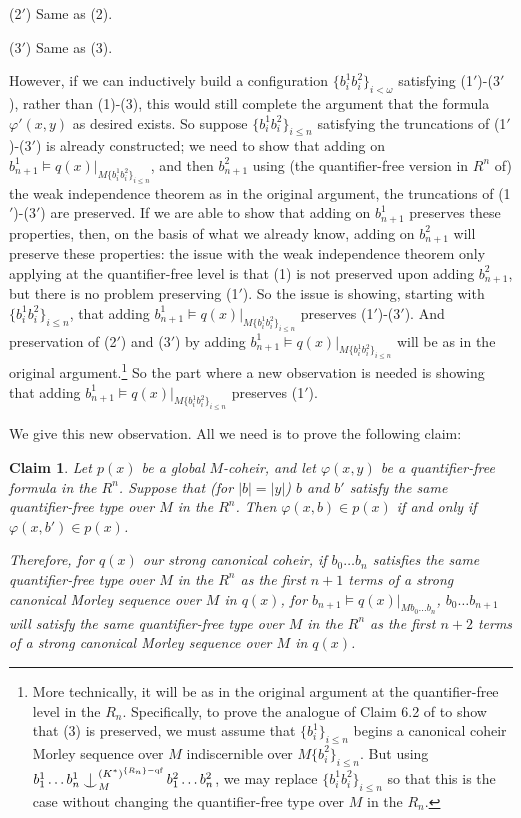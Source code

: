 \documentclass{article}
\newtheorem{claim}{Claim}
\theoremstyle{definition}
\theoremstyle{definition}
\theoremstyle{definition}
\def\Ind#1#2{#1\setbox0=\hbox{$#1x$}\kern\wd0\hbox to 0pt{\hss$#1\mid$\hss}
\lower.9\ht0\hbox to 0pt{\hss$#1\smile$\hss}\kern\wd0}
\def\ind{\mathop{\mathpalette\Ind{}}}
\begin{document}
(2$'$) Same as (2).

(3$'$) Same as (3).



However, if we can inductively build a configuration $\{b^{1}_{i}b_{i}^{2}\}_{i < \omega}$ satisfying (1$'$)-(3$'$), rather than (1)-(3), this would still complete the argument that the formula $\varphi'(x, y)$ as desired exists. So suppose $\{b^{1}_{i}b_{i}^{2}\}_{i \leq n}$ satisfying the truncations of (1$'$)-(3$'$) is already constructed; we need to show that adding on $b^{1}_{n+1} \models q(x)|_{M \{b^{1}_{i}b_{i}^{2}\}_{i \leq n} } $, and then $b^{2}_{n+1} $ using (the quantifier-free version in $R^{n}$ of) the weak independence theorem as in the original argument, the truncations of (1$'$)-(3$'$) are preserved. If we are able to show that adding on $b^{1}_{n+1}$ preserves these properties, then, on the basis of what we already know, adding on $b^{2}_{n+1} $ will preserve these properties: the issue with the weak independence theorem only applying at the quantifier-free level is that (1) is not preserved upon adding $b^{2}_{n+1} $, but there is no problem preserving (1$'$). So the issue is showing, starting with $\{b^{1}_{i}b_{i}^{2}\}_{i \leq n}$, that adding $b^{1}_{n+1} \models q(x)|_{M \{b^{1}_{i}b_{i}^{2}\}_{i \leq n} } $ preserves (1$'$)-(3$'$). And preservation of (2$'$) and (3$'$) by adding $b^{1}_{n+1} \models q(x)|_{M \{b^{1}_{i}b_{i}^{2}\}_{i \leq n} } $ will be as in the original argument.\footnote{More technically, it will be as in the original argument at the quantifier-free level in the $R_{n}$. Specifically, to prove the analogue of Claim 6.2 of \cite{Mutchnik2026nsop2} to show that (3) is preserved, we must assume that $\{b^{1}_{i}\}_{i \leq n}$ begins a canonical coheir Morley sequence over $M$ indiscernible over $M\{b^{2}_{i}\}_{i \leq n}$. But using $b^{1}_{1} \ldots b^{1}_{n}  \ind^{(K^{*})^{\{R_{n}\}-\mathrm{qf}}}_{M}b^{2}_{1} \ldots b^{2}_{n}$, we may replace $\{b^{1}_{i}b_{i}^{2}\}_{i \leq n}$ so that this is the case without changing the quantifier-free type over $M$ in the $R_{n}$.} So the part where a new observation is needed is showing that adding $b^{1}_{n+1} \models q(x)|_{M \{b^{1}_{i}b_{i}^{2}\}_{i \leq n} } $ preserves (1$'$).

We give this new observation. All we need is to prove the following claim:

\begin{claim}
    Let $p(x)$ be a global $M$-coheir, and let $\varphi(x, y)$ be a quantifier-free formula in the $R^{n}$. Suppose that (for $|b| = |y|$) $b$ and $b'$ satisfy the same quantifier-free type over $M$ in the $R^{n}$. Then $\varphi(x, b) \in p(x)$ if and only if $\varphi(x, b') \in p(x)$.

    Therefore, for $q(x)$ our strong canonical coheir, if $b_{0} \ldots b_{n}$ satisfies the same quantifier-free type over $M$ in the $R^{n}$ as the first $n+1$ terms of a strong canonical Morley sequence over $M$ in $q(x)$, for $b_{n+1} \models q(x)|_{Mb_{0} \ldots b_{n}}$,  $b_{0} \ldots b_{n+1}$ will satisfy the same quantifier-free type over $M$ in the $R^{n}$ as the first $n+2$ terms of a strong canonical Morley sequence over $M$ in $q(x)$.
\end{claim}
\end{document}
